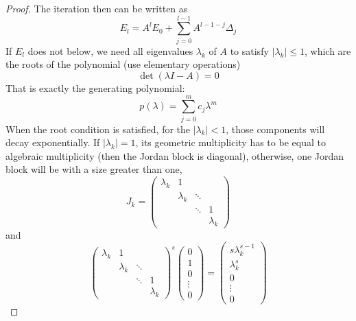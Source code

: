 \begin{proof}
    The iteration then can be written as
    \begin{equation}
        E_l = A^l E_0 + \sum_{j=0}^{l-1} A^{l-1-j} \Delta_j 
    \end{equation}
    If $E_l$ does not below, we need all eigenvalues $\lambda_k$ of $A$ to satisfy $|\lambda_k|\le 1$, which are the roots of the polynomial (use elementary operations)
    $$\det(\lambda I - A) = 0$$
    That is exactly the generating polynomial:
    \begin{equation}
        p(\lambda) = \sum_{j=0}^{m} c_j \lambda^m 
    \end{equation}
    When the root condition is satisfied, for the $|\lambda_k|<1$, those components will decay exponentially. If $|\lambda_k|=1$, its geometric multiplicity has to be equal to algebraic multiplicity (then the Jordan block is diagonal), otherwise, one Jordan block will be with a size greater than one,
     \begin{equation}
        J_k =\begin{pmatrix}
            \lambda_k & 1 &  &  \\ 
             &\lambda_k   & \ddots & \\
             &  & \ddots & 1 \\
             &&  & \lambda_k 
        \end{pmatrix}
    \end{equation}
    and 
    \begin{equation}
        \begin{pmatrix}
            \lambda_k & 1 &  &  \\ 
             &\lambda_k   & \ddots & \\
             &  & \ddots & 1 \\
             &&  & \lambda_k 
        \end{pmatrix}^s \begin{pmatrix}
           0 \\1 \\ 0 \\ \vdots \\0
        \end{pmatrix} = \begin{pmatrix}
            s \lambda_k^{s-1} \\ \lambda_k^s \\ 0\\\vdots \\ 0 
        \end{pmatrix}
    \end{equation}   

\end{proof}
